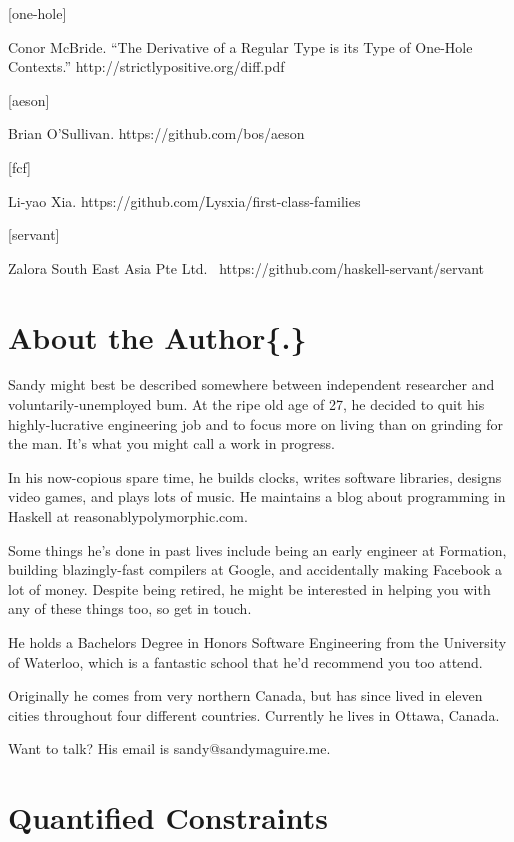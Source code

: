 \documentclass[
  11pt,
]{book}
\theoremstyle{nonumberplain}
\begin{document}
\hypertarget{bib-one-hole}{}
{[}one-hole{]}

Conor McBride. ``The Derivative of a Regular Type is its Type of
One-Hole Contexts.'' http://strictlypositive.org/diff.pdf

\hypertarget{bib-aeson}{}
{[}aeson{]}

Brian O'Sullivan. https://github.com/bos/aeson

\hypertarget{bib-fcf}{}
{[}fcf{]}

Li-yao Xia. https://github.com/Lysxia/first-class-families

\hypertarget{bib-servant}{}
{[}servant{]}

Zalora South East Asia Pte Ltd.~
https://github.com/haskell-servant/servant

\hypertarget{about-the-author.}{%
\chapter{About the Author\{.\}}\label{about-the-author.}}

Sandy might best be described somewhere between independent researcher
and voluntarily-unemployed bum. At the ripe old age of 27, he decided to
quit his highly-lucrative engineering job and to focus more on living
than on grinding for the man. It's what you might call a work in
progress.

In his now-copious spare time, he builds clocks, writes software
libraries, designs video games, and plays lots of music. He maintains a
blog about programming in Haskell at reasonablypolymorphic.com.

Some things he's done in past lives include being an early engineer at
Formation, building blazingly-fast compilers at Google, and accidentally
making Facebook a lot of money. Despite being retired, he might be
interested in helping you with any of these things too, so get in touch.

He holds a Bachelors Degree in Honors Software Engineering from the
University of Waterloo, which is a fantastic school that he'd recommend
you too attend.

Originally he comes from very northern Canada, but has since lived in
eleven cities throughout four different countries. Currently he lives in
Ottawa, Canada.

Want to talk? His email is sandy@sandymaguire.me.

\hypertarget{quantified-constraints}{%
\chapter{Quantified Constraints}\label{quantified-constraints}}
\end{document}
